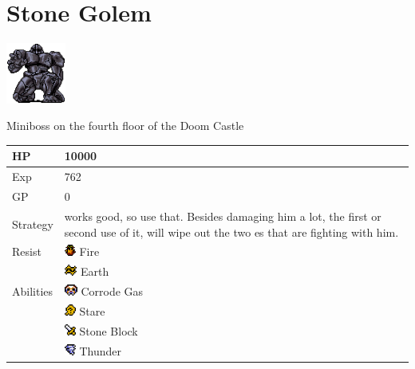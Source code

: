 \section{Stone Golem}
\label{monster:stone_golem}

\includegraphics[height=2cm,keepaspectratio]{./resources/monster/stone_golem}

Miniboss on the fourth floor of the Doom Castle

\begin{longtable}{ l p{9cm} }
	HP
	& 10000
\\ \hline
	Exp
	& 762
\\ \hline
	GP
	& 0
\\ \hline
	Strategy
	& \nameref{spell:white} works good, so use that. Besides damaging him a lot, the first or second use of it, will wipe out the two \nameref{monster:cerberus}es that are fighting with him.
\\ \hline
	Resist
	& \includegraphics[height=1em,keepaspectratio]{./resources/effects/fire} Fire \\
	& \includegraphics[height=1em,keepaspectratio]{./resources/effects/earth} Earth
\\ \hline
	Abilities
	& \includegraphics[height=1em,keepaspectratio]{./resources/effects/fatal} Corrode Gas \\
	& \includegraphics[height=1em,keepaspectratio]{./resources/effects/confusion} Stare \\
	& \includegraphics[height=1em,keepaspectratio]{./resources/effects/damage} Stone Block \\
	& \includegraphics[height=1em,keepaspectratio]{./resources/effects/wind} Thunder
\end{longtable}

